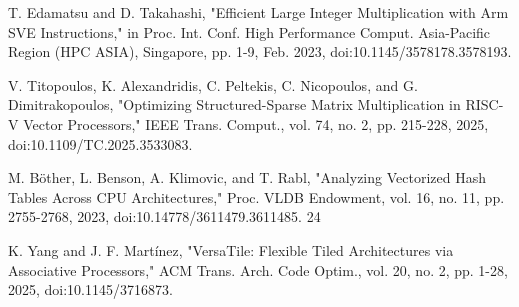 \documentclass[conference]{IEEEtran}
\begin{document}
\begin{thebibliography}{00}
 	T. Edamatsu and D. Takahashi, "Efficient Large Integer Multiplication with Arm SVE Instructions," in Proc. Int. Conf. High Performance Comput. Asia-Pacific Region (HPC ASIA), Singapore, pp. 1-9, Feb. 2023, doi:10.1145/3578178.3578193.

 	V. Titopoulos, K. Alexandridis, C. Peltekis, C. Nicopoulos, and G. Dimitrakopoulos, "Optimizing Structured-Sparse Matrix Multiplication in RISC-V Vector Processors," IEEE Trans. Comput., vol. 74, no. 2, pp. 215-228, 2025, doi:10.1109/TC.2025.3533083. 

 	M. Böther, L. Benson, A. Klimovic, and T. Rabl, "Analyzing Vectorized Hash Tables Across CPU Architectures," Proc. VLDB Endowment, vol. 16, no. 11, pp. 2755-2768, 2023, doi:10.14778/3611479.3611485. 24

 	K. Yang and J. F. Martínez, "VersaTile: Flexible Tiled Architectures via Associative Processors," ACM Trans. Arch. Code Optim., vol. 20, no. 2, pp. 1-28, 2025, doi:10.1145/3716873.

\end{thebibliography}
\end{document}
